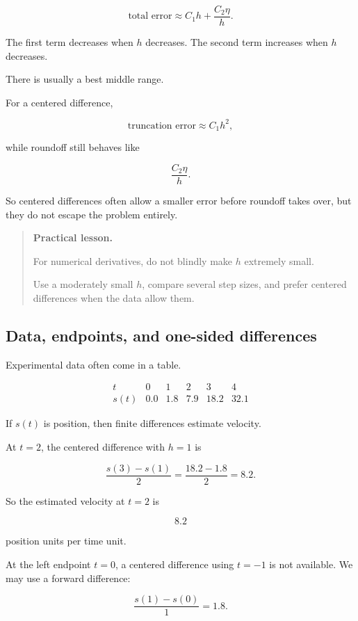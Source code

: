 \[
\boxed{
\text{total error}\approx C_1h+\frac{C_2\eta}{h}.
}
\]

The first term decreases when \(h\) decreases.  The second term increases when \(h\)
decreases.

There is usually a best middle range.

For a centered difference,

\[
\text{truncation error}\approx C_1h^2,
\]

while roundoff still behaves like

\[
\frac{C_2\eta}{h}.
\]

So centered differences often allow a smaller error before roundoff takes over, but they
do not escape the problem entirely.

\begin{quote}
\textbf{Practical lesson.}

For numerical derivatives, do not blindly make \(h\) extremely small.

Use a moderately small \(h\), compare several step sizes, and prefer centered differences
when the data allow them.
\end{quote}

\subsection{Data, endpoints, and one-sided differences}
\label{subsec:data-endpoints-one-sided-differences}

Experimental data often come in a table.

\[
\begin{array}{c|ccccc}
t & 0 & 1 & 2 & 3 & 4 \\ \hline
s(t) & 0.0 & 1.8 & 7.9 & 18.2 & 32.1
\end{array}
\]

If \(s(t)\) is position, then finite differences estimate velocity.

At \(t=2\), the centered difference with \(h=1\) is

\[
\frac{s(3)-s(1)}{2}
=
\frac{18.2-1.8}{2}
=
8.2.
\]

So the estimated velocity at \(t=2\) is

\[
8.2
\]

position units per time unit.

At the left endpoint \(t=0\), a centered difference using \(t=-1\) is not available.  We
may use a forward difference:

\[
\frac{s(1)-s(0)}{1}
=
1.8.
\]

